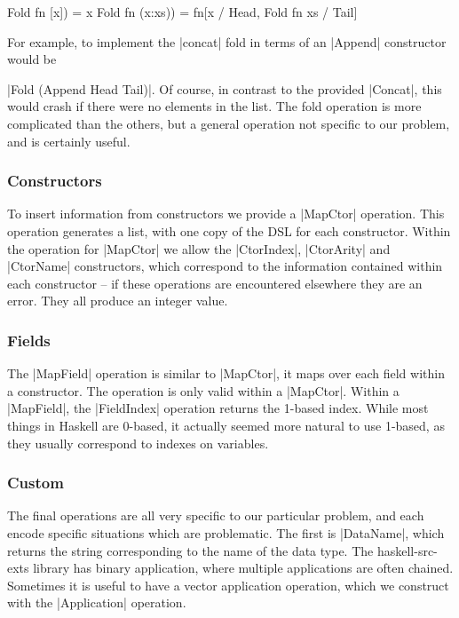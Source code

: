 \documentclass[preprint]{sigplanconf}
\begin{document}
\ignore\begin{code}
Fold fn [x]) = x
Fold fn (x:xs)) = fn[x / Head, Fold fn xs / Tail]
\end{code}

For example, to implement the |concat| fold in terms of an |Append| constructor would be \ignore|Fold (Append Head Tail)|. Of course, in contrast to the provided |Concat|, this would crash if there were no elements in the list. The fold operation is more complicated than the others, but a general operation not specific to our problem, and is certainly useful.

\subsubsection{Constructors}

To insert information from constructors we provide a |MapCtor| operation. This operation generates a list, with one copy of the DSL for each constructor. Within the operation for |MapCtor| we allow the |CtorIndex|, |CtorArity| and |CtorName| constructors, which correspond to the information contained within each constructor -- if these operations are encountered elsewhere they are an error. They all produce an integer value.

\subsubsection{Fields}

The |MapField| operation is similar to |MapCtor|, it maps over each field within a constructor. The operation is only valid within a |MapCtor|. Within a |MapField|, the |FieldIndex| operation returns the 1-based index. While most things in Haskell are 0-based, it actually seemed more natural to use 1-based, as they usually correspond to indexes on variables.

\subsubsection{Custom}

The final operations are all very specific to our particular problem, and each encode specific situations which are problematic. The first is |DataName|, which returns the string corresponding to the name of the data type. The haskell-src-exts library has binary application, where multiple applications are often chained. Sometimes it is useful to have a vector application operation, which we construct with the |Application| operation.
\end{document}
